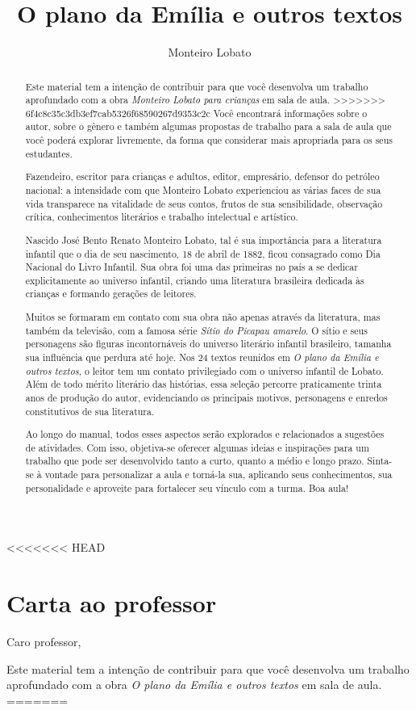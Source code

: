 \documentclass[11pt]{extarticle}
\newcommand{\AutorLivro}{Monteiro Lobato}
\newcommand{\TituloLivro}{O plano da Emília e outros textos}
\newcommand{\colaborador}{Paulo Pompermaier}
\begin{document}
\title{\TituloLivro}
\author{\AutorLivro}
\def\authornotes{\colaborador}

\date{}
\maketitle

\tableofcontents

<<<<<<< HEAD
\section{Carta ao professor}

Caro professor,

Este material tem a intenção de contribuir para que você desenvolva um trabalho aprofundado com a obra \textit{O plano da Emília e outros textos} em sala de aula.
=======
\begin{abstract}
Este material tem a intenção de contribuir para que você desenvolva um trabalho aprofundado com a obra \textit{Monteiro Lobato para crianças} em sala de aula.
>>>>>>> 6f4c8c35c3db3ef7cab5326f68590267d9353c2c
Você encontrará informações sobre o autor, sobre o gênero e também 
algumas propostas de trabalho para a sala de aula que você poderá explorar livremente, 
da forma que considerar mais apropriada para os seus estudantes.

Fazendeiro, escritor para crianças e adultos, editor, empresário,
defensor do petróleo nacional: a intensidade com que Monteiro Lobato
experienciou as várias faces de sua vida transparece na vitalidade de
seus contos, frutos de sua sensibilidade, observação crítica,
conhecimentos literários e trabalho intelectual e artístico.

Nascido José Bento Renato Monteiro Lobato, tal é sua importância para a literatura infantil que o dia de seu nascimento, 18 de abril de 1882, ficou consagrado como Dia Nacional do Livro Infantil. Sua obra foi uma das primeiras no país a se dedicar explicitamente ao universo infantil, criando uma literatura brasileira dedicada às crianças e formando gerações de leitores.

Muitos se formaram em contato com sua obra não apenas através da literatura, mas também da televisão, com a famosa série \textit{Sítio do Picapau amarelo}. O sítio e seus personagens são figuras incontornáveis do universo literário infantil brasileiro, tamanha sua influência que perdura até hoje. Nos 24 textos reunidos em \textit{O plano da Emília e outros textos}, o leitor tem um contato privilegiado com o universo infantil de Lobato.
Além de todo mérito literário das histórias, essa seleção percorre praticamente trinta anos de produção do autor, evidenciando os principais motivos, personagens e enredos constitutivos de sua literatura.

Ao longo do manual, todos esses aspectos serão explorados e relacionados a sugestões de atividades. Com isso, objetiva-se oferecer algumas ideias e inspirações para um trabalho que pode ser desenvolvido tanto a curto, quanto a médio e longo prazo. Sinta-se à vontade para personalizar a aula e torná-la sua, aplicando seus conhecimentos, sua 
personalidade e aproveite para fortalecer seu vínculo com a turma.
Boa aula!
\end{abstract}
\end{document}
